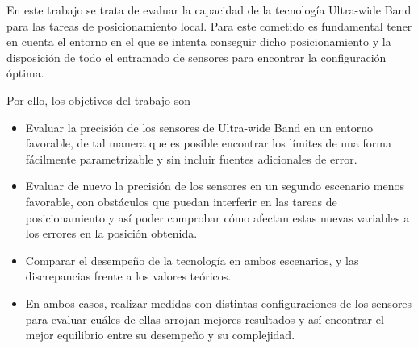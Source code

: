 En este trabajo se trata de evaluar la capacidad de la tecnología Ultra-wide Band para las tareas de posicionamiento local.
Para este cometido es fundamental tener en cuenta el entorno en el que se intenta conseguir dicho posicionamiento y la disposición de todo el entramado de sensores para encontrar la configuración óptima.

Por ello, los objetivos del trabajo son
\begin{itemize}
    \item Evaluar la precisión de los sensores de Ultra-wide Band en un entorno favorable, de tal manera que es posible encontrar los límites de una forma fácilmente parametrizable y sin incluir fuentes adicionales de error.
    \item Evaluar de nuevo la precisión de los sensores en un segundo escenario menos favorable, con obstáculos que puedan interferir en las tareas de posicionamiento y así poder comprobar cómo afectan estas nuevas variables a los errores en la posición obtenida.
    \item Comparar el desempeño de la tecnología en ambos escenarios, y las discrepancias frente a los valores teóricos.
    \item En ambos casos, realizar medidas con distintas configuraciones de los sensores para evaluar cuáles de ellas arrojan mejores resultados y así encontrar el mejor equilibrio entre su desempeño y su complejidad.
\end{itemize}